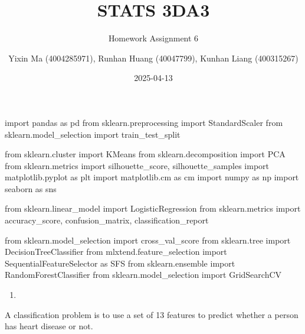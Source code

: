 \documentclass[
  11pt,
  letterpaper,
  DIV=11,
  numbers=noendperiod]{scrartcl}
\title{STATS 3DA3}
\subtitle{Homework Assignment 6}
\author{Yixin Ma (4004285971), Runhan Huang (40047799), Kunhan Liang
(400315267)}
\date{2025-04-13}
\newenvironment{Shaded}{\begin{snugshade}}{\end{snugshade}}
\newcommand{\ImportTok}[1]{\textcolor[rgb]{0.00,0.46,0.62}{#1}}
\newcommand{\NormalTok}[1]{\textcolor[rgb]{0.00,0.23,0.31}{#1}}
\providecommand{\tightlist}{%
  \setlength{\itemsep}{0pt}\setlength{\parskip}{0pt}}\usepackage{longtable,booktabs,array}
\begin{document}
\maketitle


\newpage

\begin{Shaded}
\begin{Highlighting}[]
\ImportTok{import}\NormalTok{ pandas }\ImportTok{as}\NormalTok{ pd}
\ImportTok{from}\NormalTok{ sklearn.preprocessing }\ImportTok{import}\NormalTok{ StandardScaler}
\ImportTok{from}\NormalTok{ sklearn.model\_selection }\ImportTok{import}\NormalTok{ train\_test\_split}

\ImportTok{from}\NormalTok{ sklearn.cluster }\ImportTok{import}\NormalTok{ KMeans}
\ImportTok{from}\NormalTok{ sklearn.decomposition }\ImportTok{import}\NormalTok{ PCA}
\ImportTok{from}\NormalTok{ sklearn.metrics }\ImportTok{import}\NormalTok{ silhouette\_score, silhouette\_samples}
\ImportTok{import}\NormalTok{ matplotlib.pyplot }\ImportTok{as}\NormalTok{ plt}
\ImportTok{import}\NormalTok{ matplotlib.cm }\ImportTok{as}\NormalTok{ cm}
\ImportTok{import}\NormalTok{ numpy }\ImportTok{as}\NormalTok{ np}
\ImportTok{import}\NormalTok{ seaborn }\ImportTok{as}\NormalTok{ sns}

\ImportTok{from}\NormalTok{ sklearn.linear\_model }\ImportTok{import}\NormalTok{ LogisticRegression}
\ImportTok{from}\NormalTok{ sklearn.metrics }\ImportTok{import}\NormalTok{ accuracy\_score, confusion\_matrix, classification\_report}

\ImportTok{from}\NormalTok{ sklearn.model\_selection }\ImportTok{import}\NormalTok{ cross\_val\_score}
\ImportTok{from}\NormalTok{ sklearn.tree }\ImportTok{import}\NormalTok{ DecisionTreeClassifier}
\ImportTok{from}\NormalTok{ mlxtend.feature\_selection }\ImportTok{import}\NormalTok{ SequentialFeatureSelector }\ImportTok{as}\NormalTok{ SFS}
\ImportTok{from}\NormalTok{ sklearn.ensemble }\ImportTok{import}\NormalTok{ RandomForestClassifier}
\ImportTok{from}\NormalTok{ sklearn.model\_selection }\ImportTok{import}\NormalTok{ GridSearchCV}
\end{Highlighting}
\end{Shaded}

\begin{enumerate}
\def\labelenumi{(\arabic{enumi})}
\tightlist
\item
\end{enumerate}

A classification problem is to use a set of 13 features to predict
whether a person has heart disease or not.
\end{document}
